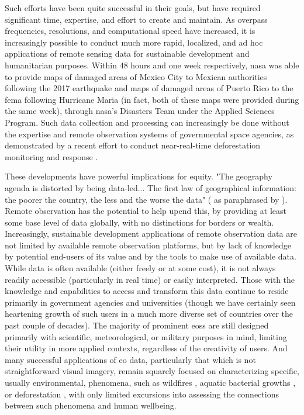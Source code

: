 \documentclass[notitlepage]{article}
\begin{document}
Such efforts have been quite successful in their goals, but have required significant time, expertise, and effort to create and maintain. As overpass frequencies, resolutions, and computational speed have increased, it is increasingly possible to conduct much more rapid, localized, and ad hoc applications of remote sensing data for sustainable development and humanitarian purposes. Within 48 hours and one week respectively, \ac{nasa} was able to provide maps of damaged areas of Mexico City to Mexican authorities following the 2017 earthquake \cite{nasajetpropulsionlaboratorySatelliteRadarDetects2017} and maps of damaged areas of Puerto Rico to the \ac{fema} following Hurricane Maria \cite{nasajetpropulsionlaboratorySatelliteDataPuerto2017} (in fact, both of these maps were provided during the same week), through \ac{nasa}'s Disasters Team under the Applied Sciences Program. Such data collection and processing can increasingly be done without the expertise and remote observation systems of governmental space agencies, as demonstrated by a recent effort to conduct near-real-time deforestation monitoring and response \cite{finerCombatingDeforestationSatellite2018}.

These developments have powerful implications for equity. "The geography agenda is distorted by being data-led... The first law of geographical information: the poorer the country, the less and the worse the data"  (\cite{overton1991further} as paraphrased by \cite{taylorGeographicInformationSystems1994}). Remote observation has the potential to help upend this, by providing at least some base level of data globally, with no distinctions for borders or wealth. Increasingly, sustainable development applications of remote observation data are not limited by available remote observation platforms, but by lack of knowledge by potential end-users of its value and by the tools to make use of available data. While data is often available (either freely or at some cost), it is not always readily accessible (particularly in real time) or easily interpreted. Those with the knowledge and capabilities to access and transform this data continue to reside primarily in government agencies and universities (though we have certainly seen heartening growth of such users in a much more diverse set of countries over the past couple of decades). The majority of prominent \acp{eos} are still designed primarily with scientific, meteorological, or military purposes in mind, limiting their utility in more applied contexts, regardless of the creativity of users. And many successful applications of \ac{eo} data, particularly that which is not straightforward visual imagery, remain squarely focused on characterizing specific, usually environmental, phenomena, such as wildfires \cite{schroederNewVIIRS375m2014},  aquatic bacterial growths \cite{stromingQuantifyingHumanHealth2020}, or deforestation \cite{lagomasinoMeasuringMangroveCarbon2019}, with only limited excursions into assessing the connections between such phenomena and human wellbeing.
\end{document}
